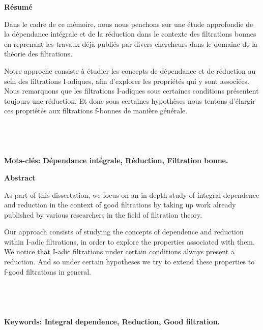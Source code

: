 \newpage
{}
\begin{center}
	\LARGE{\textbf{Résumé}}
\end{center}

Dans le cadre de ce mémoire, nous nous penchons sur une étude approfondie de la dépendance intégrale et de la réduction dans le contexte des filtrations bonnes en reprenant les travaux déjà publiés par divers chercheurs dans le domaine de la théorie des filtrations.

Notre approche consiste à étudier les concepts de dépendance et de réduction au sein des filtrations I-adiques, afin d'explorer les propriétés qui y sont associées. Nous remarquons que les filtrations I-adiques sous certaines conditions présentent toujours une réduction. Et donc sous certaines hypothèses nous tentons d'élargir ces propriétés aux filtrations f-bonnes de manière générale. 
\\
\\
\\
\\
\\
\textbf{ Mots-clés: Dépendance intégrale, Réduction, Filtration bonne.} 



\newpage
{}
\begin{center}
	\LARGE{\textbf{Abstract}}
\end{center}

As part of this dissertation, we focus on an in-depth study of integral dependence and reduction in the context of good filtrations by taking up work already published by various researchers in the field of filtration theory.

Our approach consists of studying the concepts of dependence and reduction within I-adic filtrations, in order to explore the properties associated with them. We notice that I-adic filtrations under certain conditions always present a reduction. And so under certain hypotheses we try to extend these properties to f-good filtrations in general.
\\
\\
\\
\\
\\
\textbf{Keywords: Integral dependence, Reduction, Good filtration.} 